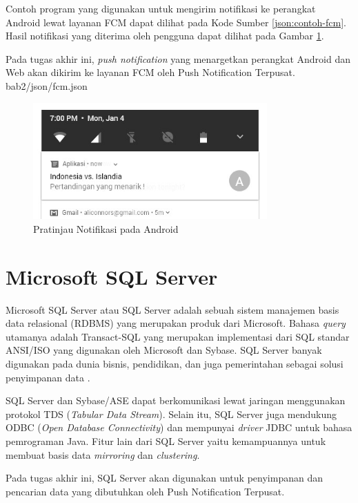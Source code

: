 \par Contoh program yang digunakan untuk mengirim notifikasi ke perangkat Android lewat layanan FCM dapat dilihat pada Kode Sumber \ref{json:contoh-fcm}. Hasil notifikasi yang diterima oleh pengguna dapat dilihat pada Gambar \ref{img:contoh-hasil-fcm}.
\par Pada tugas akhir ini, \textit{push notification} yang menargetkan perangkat Android dan Web akan dikirim ke layanan FCM oleh Push Notification Terpusat.
 {bab2/json/fcm.json}
\begin{figure}[H]
	\centering\includegraphics[width=0.8\textwidth]{bab2/img/fcm.jpg}
	\caption{Pratinjau Notifikasi pada Android}
	\label{img:contoh-hasil-fcm}
\end{figure}

\section{Microsoft SQL Server}
\par Microsoft SQL Server atau SQL Server adalah sebuah sistem manajemen basis data relasional (RDBMS) yang merupakan produk dari Microsoft. Bahasa \textit{query} utamanya adalah Transact-SQL yang merupakan implementasi dari SQL standar ANSI/ISO yang digunakan oleh Microsoft dan Sybase. SQL Server banyak digunakan pada dunia bisnis, pendidikan, dan juga pemerintahan sebagai solusi penyimpanan data \cite{sql-server-online}.
\par SQL Server dan Sybase/ASE dapat berkomunikasi lewat jaringan menggunakan protokol TDS (\textit{Tabular Data Stream}). Selain itu, SQL Server juga mendukung ODBC (\textit{Open Database Connectivity}) dan mempunyai \textit{driver} JDBC untuk bahasa pemrograman Java. Fitur lain dari SQL Server yaitu kemampuannya untuk membuat basis data \textit{mirroring} dan \textit{clustering}.
\par Pada tugas akhir ini, SQL Server akan digunakan untuk penyimpanan dan pencarian data yang dibutuhkan oleh Push Notification Terpusat.

